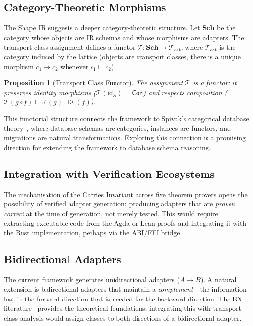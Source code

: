 \documentclass[11pt,a4paper]{article}
\newtheorem{proposition}[theorem]{Proposition}
\theoremstyle{definition}
\theoremstyle{remark}
\newcommand{\TC}{\mathcal{T}}                    %
\newcommand{\conc}{\textsf{Con}}                 %
\newcommand{\Schemas}{\mathbf{Sch}}              %
\begin{document}
\subsection{Category-Theoretic Morphisms}

The Shape IR suggests a deeper category-theoretic structure. Let
$\Schemas$ be the category whose objects are IR schemas and whose
morphisms are adapters. The transport class assignment defines a
functor $\TC : \Schemas \to \TC_{\text{cat}}$, where
$\TC_{\text{cat}}$ is the category induced by the lattice (objects
are transport classes, there is a unique morphism $c_1 \to c_2$
whenever $c_1 \sqsubseteq c_2$).

\begin{proposition}[Transport Class Functor]
The assignment $\TC$ is a functor: it preserves identity morphisms
($\TC(\mathsf{id}_A) = \conc$) and respects composition
($\TC(g \circ f) \sqsubseteq \TC(g) \sqcup \TC(f)$).
\end{proposition}

This functorial structure connects the framework to Spivak's
categorical database theory~\cite{spivak2012functorial}, where
database schemas are categories, instances are functors, and
migrations are natural transformations. Exploring this connection
is a promising direction for extending the framework to database
schema reasoning.

\subsection{Integration with Verification Ecosystems}

The mechanisation of the Carries Invariant across five theorem provers
opens the possibility of verified adapter generation: producing
adapters that are \emph{proven correct} at the time of generation,
not merely tested. This would require extracting executable code from
the Agda or Lean proofs and integrating it with the Rust
implementation, perhaps via the ABI/FFI bridge.

\subsection{Bidirectional Adapters}

The current framework generates unidirectional adapters ($A \to B$).
A natural extension is bidirectional adapters that maintain a
\emph{complement}---the information lost in the forward direction
that is needed for the backward direction. The BX
literature~\cite{czarnecki2009bidirectional,hofmann2011symmetric}
provides the theoretical foundations; integrating this with
transport class analysis would assign classes to both directions
of a bidirectional adapter.
\end{document}
